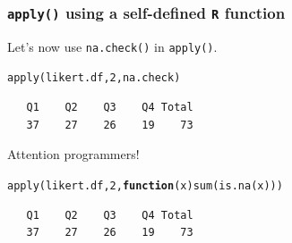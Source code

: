 \documentclass{beamer}\usepackage[]{graphicx}\usepackage[]{color}
\makeatletter
\newcommand{\hlnum}[1]{\textcolor[rgb]{0.533,0,0.133}{#1}}%
\newcommand{\hlstd}[1]{\textcolor[rgb]{0,0,0}{#1}}%
\newcommand{\hlkwa}[1]{\textcolor[rgb]{0.4,0.067,0.067}{\textbf{#1}}}%
\newcommand{\hlkwc}[1]{\textcolor[rgb]{0,0,0.4}{#1}}%
\newcommand{\hlkwd}[1]{\textcolor[rgb]{0,0.267,0.4}{#1}}%
\newenvironment{kframe}{%
 \def\at@end@of@kframe{}%
 \ifinner\ifhmode%
  \def\at@end@of@kframe{\end{minipage}}%
  \begin{minipage}{\columnwidth}%
 \fi\fi%
 \def\FrameCommand##1{\hskip\@totalleftmargin \hskip-\fboxsep
 \colorbox{shadecolor}{##1}\hskip-\fboxsep
     \hskip-\linewidth \hskip-\@totalleftmargin \hskip\columnwidth}%
 \MakeFramed {\advance\hsize-\width
   \@totalleftmargin\z@ \linewidth\hsize
   \@setminipage}}%
 {\par\unskip\endMakeFramed%
 \at@end@of@kframe}
\newenvironment{knitrout}{}{} %
\makeatother
\begin{document}
\begin{frame}[fragile]
\frametitle{\texttt{apply()} using a self-defined \texttt{R} function}
Let's now use \texttt{na.check()} in \texttt{apply()}.
\begin{knitrout}
\color{fgcolor}\begin{kframe}
\begin{alltt}
\hlkwd{apply}\hlstd{(likert.df,} \hlnum{2}\hlstd{, na.check)}
\end{alltt}
\begin{verbatim}
   Q1    Q2    Q3    Q4 Total 
   37    27    26    19    73 
\end{verbatim}
\end{kframe}
\end{knitrout}
\vspace{4mm}
Attention programmers!
\begin{knitrout}
\color{fgcolor}\begin{kframe}
\begin{alltt}
\hlkwd{apply}\hlstd{(likert.df,} \hlnum{2}\hlstd{,} \hlkwa{function}\hlstd{(}\hlkwc{x}\hlstd{)} \hlkwd{sum}\hlstd{(}\hlkwd{is.na}\hlstd{(x)))}
\end{alltt}
\begin{verbatim}
   Q1    Q2    Q3    Q4 Total 
   37    27    26    19    73 
\end{verbatim}
\end{kframe}
\end{knitrout}
\end{frame} 
\end{document}
